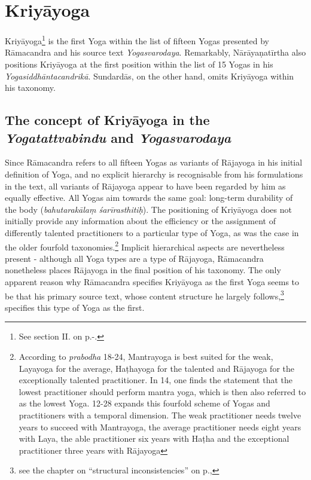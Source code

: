 \section{Kriyāyoga}

Kriyāyoga\footnote{See section II. on p.\pageref{kriyayogastart}-\pageref{kriyayogaend}.} is the first Yoga within the list of fifteen Yogas presented by Rāmacandra and his source text \textit{Yogasvarodaya}. Remarkably, Nārāyaṇatīrtha also positions Kriyāyoga at the first position within the list of 15 Yogas in his \textit{Yogasiddhāntacandrikā}. Sundardās, on the other hand, omits Kriyāyoga within his taxonomy.

\subsection{The concept of Kriyāyoga in the \textit{Yogatattvabindu} and \textit{Yogasvarodaya}}

Since Rāmacandra refers to all fifteen Yogas as variants of Rājayoga in his initial definition of Yoga, and no explicit hierarchy is recognisable from his formulations in the text, all variants of Rājayoga appear to have been regarded by him as equally effective. All Yogas aim towards the same goal: long-term durability of the body (\textit{bahutarakālaṃ śarīrasthitiḥ}). The positioning of Kriyāyoga does not initially provide any information about the efficiency or the assignment of differently talented practitioners to a particular type of Yoga, as was the case in the older fourfold taxonomies.\footnote{According to \textit{prabodha} 18-24, Mantrayoga is best suited for the weak, Layayoga for the average, Haṭhayoga for the talented and Rājayoga for the exceptionally talented practitioner. In  14, one finds the statement that the lowest practitioner should perform mantra yoga, which is then also referred to as the lowest Yoga.  12-28 expands this fourfold scheme of Yogas and practitioners with a temporal dimension. The weak practitioner needs twelve years to succeed with Mantrayoga, the average practitioner needs eight years with Laya, the able practitioner six years with Haṭha and the exceptional practitioner three years with Rājayoga} Implicit hierarchical aspects are nevertheless present - although all Yoga types are a type of Rājayoga, Rāmacandra nonetheless places Rājayoga in the final position of his taxonomy.
The only apparent reason why Rāmacandra specifies Kriyāyoga as the first Yoga seems to be that his primary source text, whose content structure he largely follows,\footnote{see the chapter on ``structural inconsistencies'' on p.\pageref{struktur},} specifies this type of Yoga as the first.


